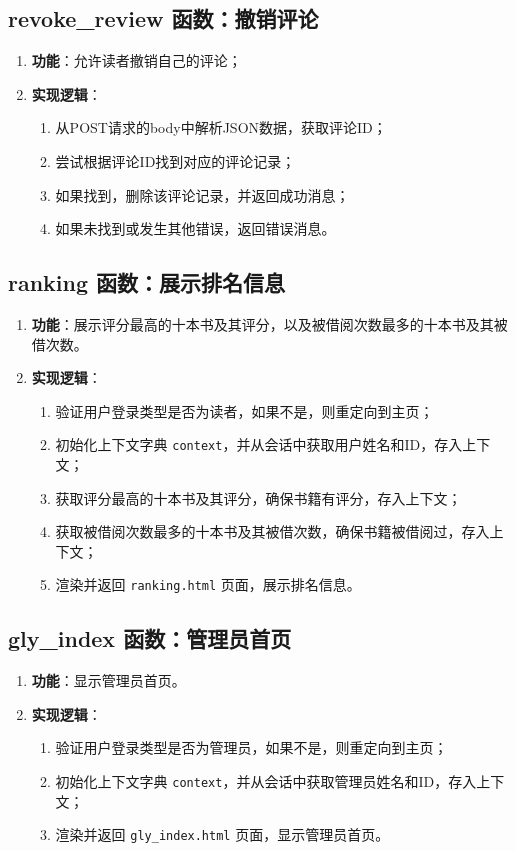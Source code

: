 \documentclass{ctexart}
\begin{document}
\subsection{revoke\_review 函数：撤销评论}
\begin{enumerate}
    \item \textbf{功能}：允许读者撤销自己的评论；
    \item \textbf{实现逻辑}：
    \begin{enumerate}
        \item 从POST请求的body中解析JSON数据，获取评论ID；
        \item 尝试根据评论ID找到对应的评论记录；
        \item 如果找到，删除该评论记录，并返回成功消息；
        \item 如果未找到或发生其他错误，返回错误消息。
    \end{enumerate}
\end{enumerate}
\subsection{ranking 函数：展示排名信息}
\begin{enumerate}
    \item \textbf{功能}：展示评分最高的十本书及其评分，以及被借阅次数最多的十本书及其被借次数。
    \item \textbf{实现逻辑}：
    \begin{enumerate}
        \item 验证用户登录类型是否为读者，如果不是，则重定向到主页；
        \item 初始化上下文字典 \texttt{context}，并从会话中获取用户姓名和ID，存入上下文；
        \item 获取评分最高的十本书及其评分，确保书籍有评分，存入上下文；
        \item 获取被借阅次数最多的十本书及其被借次数，确保书籍被借阅过，存入上下文；
        \item 渲染并返回 \texttt{ranking.html} 页面，展示排名信息。
    \end{enumerate}
\end{enumerate}

\subsection{gly\_index 函数：管理员首页}
\begin{enumerate}
    \item \textbf{功能}：显示管理员首页。
    \item \textbf{实现逻辑}：
    \begin{enumerate}
        \item 验证用户登录类型是否为管理员，如果不是，则重定向到主页；
        \item 初始化上下文字典 \texttt{context}，并从会话中获取管理员姓名和ID，存入上下文；
        \item 渲染并返回 \texttt{gly\_index.html} 页面，显示管理员首页。
    \end{enumerate}
\end{enumerate}
\end{document}
